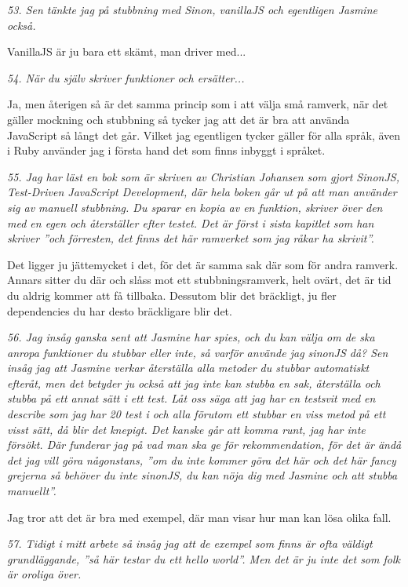 \documentclass[11pt]{article}
\begin{document}
\emph{53. Sen tänkte jag på stubbning med Sinon, vanillaJS och egentligen Jasmine också.}

VanillaJS är ju bara ett skämt, man driver med...

\emph{54. När du själv skriver funktioner och ersätter...}

Ja, men återigen så är det samma princip som i att välja små ramverk, när det gäller mockning och stubbning så tycker jag att det är bra att använda JavaScript så långt det går. Vilket jag egentligen tycker gäller för alla språk, även i Ruby använder jag i första hand det som finns inbyggt i språket.

\emph{55. Jag har läst en bok som är skriven av Christian Johansen som gjort SinonJS, Test-Driven JavaScript Development, där hela boken går ut på att man använder sig av manuell stubbning. Du sparar en kopia av en funktion, skriver över den med en egen och återställer efter testet. Det är först i sista kapitlet som han skriver ”och förresten, det finns det här ramverket som jag råkar ha skrivit”.}

Det ligger ju jättemycket i det, för det är samma sak där som för andra ramverk. Annars sitter du där och slåss mot ett stubbningsramverk, helt ovärt, det är tid du aldrig kommer att få tillbaka. Dessutom blir det bräckligt, ju fler dependencies du har desto bräckligare blir det.

\emph{56. Jag insåg ganska sent att Jasmine har spies, och du kan välja om de ska anropa funktioner du stubbar eller inte, så varför använde jag sinonJS då? Sen insåg jag att Jasmine verkar återställa alla metoder du stubbar automatiskt efteråt, men det betyder ju också att jag inte kan stubba en sak, återställa och stubba på ett annat sätt i ett test. Låt oss säga att jag har en testsvit med en describe som jag har 20 test i och alla förutom ett stubbar en viss metod på ett visst sätt, då blir det knepigt. Det kanske går att komma runt, jag har inte försökt. Där funderar jag på vad man ska ge för rekommendation, för det är ändå det jag vill göra någonstans, ”om du inte kommer göra det här och det här fancy grejerna så behöver du inte sinonJS, du kan nöja dig med Jasmine och att stubba manuellt”.}

Jag tror att det är bra med exempel, där man visar hur man kan lösa olika fall.

\emph{57. Tidigt i mitt arbete så insåg jag att de exempel som finns är ofta väldigt grundläggande, ”så här testar du ett hello world”. Men det är ju inte det som folk är oroliga över.}
\end{document}
